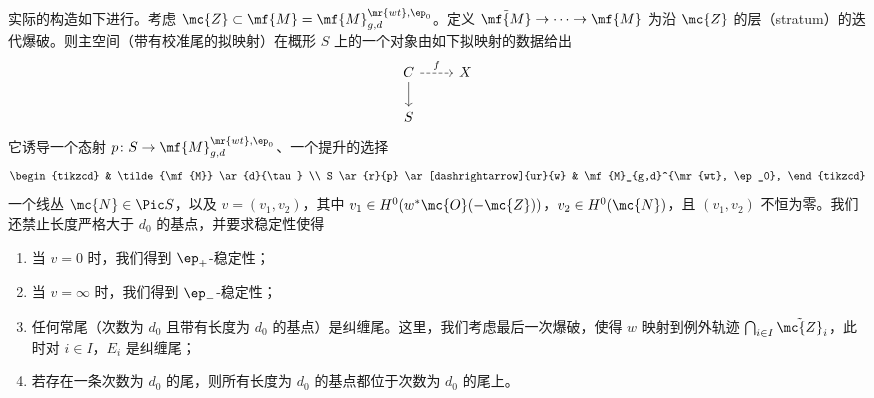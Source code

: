 实际的构造如下进行。考虑 \(\mc{Z} \subset \mf{M} = \mf{M}_{g,d}^{\mr{wt}, \ep_0}\)。定义 \(\tilde{\mf{M}} \to \cdots \to \mf{M}\) 为沿 \(\mc{Z}\) 的层（stratum）的迭代爆破。则主空间（带有校准尾的拟映射）在概形 \(S\) 上的一个对象由如下拟映射的数据给出
\begin{equation*}
\begin{tikzcd}
    C \ar{d} \ar[dashrightarrow]{r}{f} & X \\
    S
\end{tikzcd}
\end{equation*}
它诱导一个态射 \(p \colon S \to \mf{M}_{g,d}^{\mr{wt}, \ep_0}\)、一个提升的选择
\begin{equation*}
\begin{tikzcd}
    & \tilde{\mf{M}} \ar{d}{\tau} \\
    S \ar{r}{p} \ar[dashrightarrow]{ur}{w} & \mf{M}_{g,d}^{\mr{wt}, \ep_0},
\end{tikzcd}
\end{equation*}
一个线丛 \(\mc{N} \in \Pic S\)，以及 \(v = (v_1, v_2)\)，其中 \(v_1 \in H^0(w^* \mc{O}(-\mc{Z}))\)，\(v_2 \in H^0(\mc{N})\)，且 \((v_1, v_2)\) 不恒为零。我们还禁止长度严格大于 \(d_0\) 的基点，并要求稳定性使得
\begin{enumerate}
    \item 当 \(v = 0\) 时，我们得到 \(\ep_+\)-稳定性；
    \item 当 \(v = \infty\) 时，我们得到 \(\ep_-\)-稳定性；
    \item 任何常尾（次数为 \(d_0\) 且带有长度为 \(d_0\) 的基点）是纠缠尾。这里，我们考虑最后一次爆破，使得 \(w\) 映射到例外轨迹 \(\bigcap_{i \in I} \tilde{\mc{Z}}_i\)，此时对 \(i \in I\)，\(E_i\) 是纠缠尾；
    \item 若存在一条次数为 \(d_0\) 的尾，则所有长度为 \(d_0\) 的基点都位于次数为 \(d_0\) 的尾上。
\end{enumerate}







